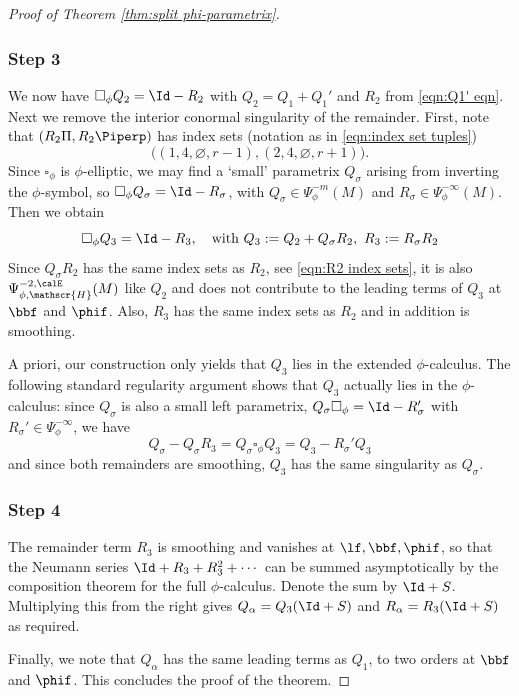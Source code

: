 \begin{proof}[Proof of Theorem \ref{thm:split phi-parametrix}]
\subsubsection*{Step 3}
We now have $\square_\phi Q_2 = \Id - R_2$ with $Q_2=Q_1+Q_1'$ and $R_2$ from \eqref{eqn:Q1' eqn}.
Next we remove the interior conormal singularity of the remainder. First, note that $(R_2\Pi, R_2\Piperp)$
has index sets (notation as in \eqref{eqn:index set tuples})
\begin{equation}
\label{eqn:R2 index sets}
\bigl((1,4,\varnothing,r-1), (2,4,\varnothing,r+1) \bigr).
\end{equation}
Since $\square_\phi$ is $\phi$-elliptic, we may find a `small' parametrix $Q_\sigma$
arising from inverting the $\phi$-symbol, so $\square_\phi Q_\sigma = \Id -R_\sigma$,
with $Q_\sigma \in \Psi^{-m}_\phi(M)$ and $R_\sigma \in \Psi^{-\infty}_\phi(M)$.
Then we obtain
\[
\square_\phi Q_3=\Id - R_3, \quad \text{with} \ Q_3:=Q_2 + Q_\sigma R_2, \ R_3:= R_\sigma R_2
\]
Since $Q_\sigma R_2$ has the same index sets as $R_2$, see \eqref{eqn:R2 index sets}, it is
also $\Psi^{-2,\calE}_{\phi, \mathscr{H}}(M)$ like $Q_2$ and does not contribute to the leading terms
of $Q_3$ at $\bbf$ and $\phif$. Also, $R_3$ has the same index sets as $R_2$ and in addition is smoothing.

A priori, our construction only yields that $Q_3$ lies in the extended $\phi$-calculus.
The following standard regularity argument shows that $Q_3$ actually lies in the $\phi$-calculus: since $Q_\sigma$ is also a small left parametrix, $Q_\sigma\square_\phi=\Id - R_{\sigma}'$ with $R_{\sigma}'\in\Psi^{-\infty}_\phi$, we have
\[
Q_\sigma - Q_\sigma R_3 = Q_\sigma \square_\phi Q_3 = Q_3 - R_{\sigma}' Q_3
\]
and since both remainders are smoothing, $Q_3$ has the same singularity as $Q_\sigma$.

\subsubsection*{Step 4}
The remainder term $R_3$ is smoothing and vanishes at $\lf,\bbf,\phif$, so that the Neumann series $\Id+R_3+R_3^2+\cdots$ can be summed asymptotically by the composition theorem for the full $\phi$-calculus. Denote the sum by $\Id+S$. Multiplying this from the right gives $Q_\alpha =Q_3(\Id+S)$ and $R_\alpha=R_3(\Id+S)$ as required.

Finally, we note that $Q_\alpha$ has the same leading terms as $Q_1$, to two orders at $\bbf$ and $\phif$.
This concludes the proof of the theorem.
\end{proof}

